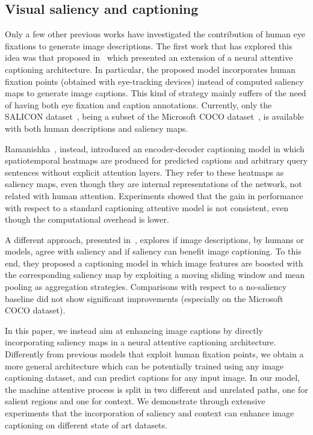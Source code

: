 \subsection{Visual saliency and captioning}
Only a few other previous works have investigated the contribution of human eye fixations to generate image descriptions. The first work that has explored this idea was that proposed in~\cite{sugano2016seeing} which presented an extension of a neural attentive captioning architecture. In particular, the proposed model incorporates human fixation points (obtained with eye-tracking devices) instead of computed saliency maps to generate image captions. This kind of strategy mainly suffers of the need of having both eye fixation and caption annotations. Currently, only the SALICON dataset~\cite{jiang2015salicon}, being a subset of the Microsoft COCO dataset~\cite{lin2014microsoft}, is available with both human descriptions and saliency maps. 

Ramanishka~\etal\cite{ramanishka2016top}, instead, introduced an encoder-decoder captioning model in which spatiotemporal heatmaps are produced for predicted captions and arbitrary query sentences without explicit attention layers. They refer to these heatmaps as saliency maps, even though they are internal representations of the network, not related with human attention. Experiments showed that the gain in performance with respect to a standard captioning attentive model is not consistent, even though the computational overhead is lower.

A different approach, presented in~\cite{tavakoli2017can}, explores if image descriptions, by humans or models, agree with saliency and if saliency can benefit image captioning. To this end, they proposed a captioning model in which image features are boosted with the corresponding saliency map by exploiting a moving sliding window and mean pooling as aggregation strategies. Comparisons with respect to a no-saliency baseline did not show significant improvements (especially on the Microsoft COCO dataset).

In this paper, we instead aim at enhancing image captions by directly incorporating saliency maps in a neural attentive captioning architecture. Differently from previous models that exploit human fixation points, we obtain a more general architecture which can be potentially trained using any image captioning dataset, and can predict captions for any input image. In our model, the machine attentive process is split in two different and unrelated paths, one for salient regions and one for context. We demonstrate through extensive experiments that the incorporation of saliency and context can enhance image captioning on different state of art datasets.

